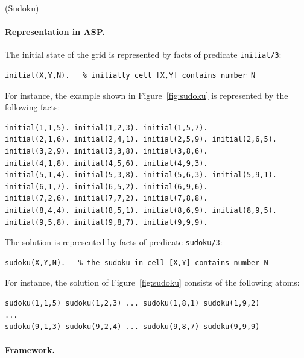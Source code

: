 \documentclass[a4paper,12pt]{article}
\begin{document}
\begin{PraktikumsAufgabe}{1}{(Sudoku)}
\paragraph{Representation in ASP.}
The initial state of the grid is represented by facts of predicate \texttt{initial/3}:
\vspace{-1.5mm}
\begin{verbatim}
initial(X,Y,N).   % initially cell [X,Y] contains number N 
\end{verbatim}
\vspace{-1mm}
For instance, the example shown in Figure~\ref{fig:sudoku} is
represented by the following facts:%
\vspace{-1.5mm}
\begin{verbatim}
initial(1,1,5). initial(1,2,3). initial(1,5,7).
initial(2,1,6). initial(2,4,1). initial(2,5,9). initial(2,6,5).
initial(3,2,9). initial(3,3,8). initial(3,8,6).
initial(4,1,8). initial(4,5,6). initial(4,9,3).
initial(5,1,4). initial(5,3,8). initial(5,6,3). initial(5,9,1).
initial(6,1,7). initial(6,5,2). initial(6,9,6).
initial(7,2,6). initial(7,7,2). initial(7,8,8).
initial(8,4,4). initial(8,5,1). initial(8,6,9). initial(8,9,5).
initial(9,5,8). initial(9,8,7). initial(9,9,9).
\end{verbatim}
\vspace{-1mm}
The solution is represented by facts of predicate \texttt{sudoku/3}:
\vspace{-1.5mm}
\begin{verbatim}
sudoku(X,Y,N).   % the sudoku in cell [X,Y] contains number N 
\end{verbatim}
\vspace{-1mm}
For instance, the solution of Figure~\ref{fig:sudoku} consists of the following atoms:
\vspace{-1.5mm}
\begin{verbatim}
sudoku(1,1,5) sudoku(1,2,3) ... sudoku(1,8,1) sudoku(1,9,2)
...
sudoku(9,1,3) sudoku(9,2,4) ... sudoku(9,8,7) sudoku(9,9,9)
\end{verbatim}
\vspace{-1mm}

\paragraph{Framework.}


\end{PraktikumsAufgabe}
\end{document}
